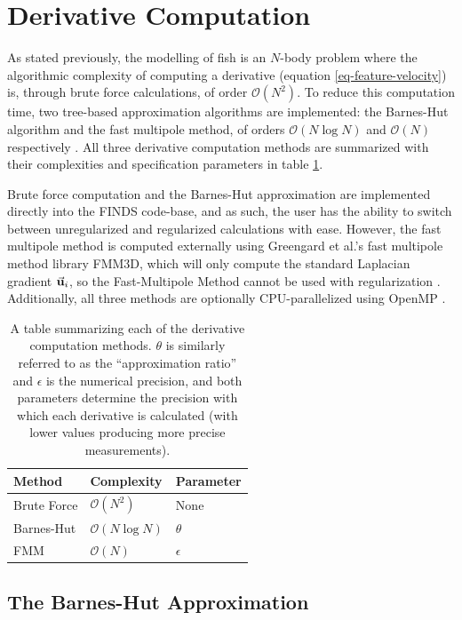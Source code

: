 \documentclass[letterpaper, 10pt, twoside]{LTJournalArticle}
\renewcommand{\O}{\mathcal{O}}
\begin{document}
\section{Derivative Computation} \label{section-derivative-computation}

As stated previously, the modelling of fish is an $N$-body problem where the
algorithmic complexity of computing a derivative (equation
\ref{eq-feature-velocity}) is, through brute force
calculations, of order $\O(N^2)$. To reduce this computation time,
two tree-based approximation algorithms are implemented: the Barnes-Hut
algorithm and the fast multipole method, of orders $\O(N \log N)$ and
$\O(N)$ respectively \cite{barnes_hut_1986, greengard_rokhlin_1987}. All three
derivative computation methods are summarized with their complexities and
specification parameters in table \ref{tbl-derivative-methods}. 

Brute force computation and the Barnes-Hut approximation are implemented
directly into the FINDS code-base, and as such, the user has the ability to
switch between unregularized and regularized calculations with ease. However,
the fast multipole method is computed externally using Greengard et al.'s fast
multipole method library FMM3D, which will only compute the standard Laplacian
gradient $\va{u}_i$, so the Fast-Multipole Method cannot be used with
regularization \cite{fmm3d_2026}. Additionally, all three methods are
optionally CPU-parallelized using OpenMP \cite{openmp_2024}.

\begin{table}[htbp]
\centering
\begin{tabular}{lll}
\textbf{Method} & \textbf{Complexity} & \textbf{Parameter} \\ \hline
Brute Force     & $\O(N^2)$           & None               \\
Barnes-Hut      & $\O(N \log N)$      & $\theta$           \\
FMM             & $\O(N)$             & $\epsilon$
\end{tabular}
\caption{A table summarizing each of the derivative computation methods.
  $\theta$ is similarly referred to as the ``approximation ratio'' and
  $\epsilon$ is the numerical precision, and both parameters determine the
  precision with which each derivative is calculated (with lower values
  producing more precise measurements).
}
\label{tbl-derivative-methods}
\end{table}

\subsection{The Barnes-Hut Approximation}
\label{subsection-barnes-hut}
\end{document}
